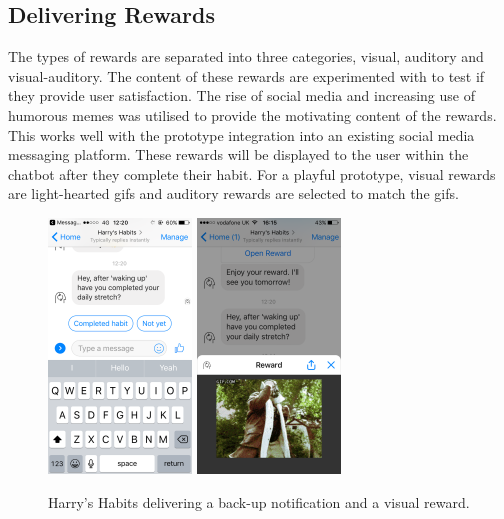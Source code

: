 \subsection*{Delivering Rewards}
The types of rewards are separated into three categories, visual, auditory and visual-auditory. The content of these rewards are experimented with to test if they provide user satisfaction. The rise of social media and increasing use of humorous memes was utilised to provide the motivating content of the rewards. This works well with the prototype integration into an existing social media messaging platform. These rewards will be displayed to the user within the chatbot after they complete their habit. For a playful prototype, visual rewards are light-hearted gifs and auditory rewards are selected to match the gifs.


\begin{figure}[H]
  \centering
  \includegraphics[width=1.5in]{resources/figures/reminder.png}
  \hspace{10px}
  \includegraphics[width=1.5in]{resources/figures/reward-visual.png}
  \caption{Harry's Habits delivering a back-up notification and a visual reward.}
  \label{fig:setup_media_1}
\end{figure}


